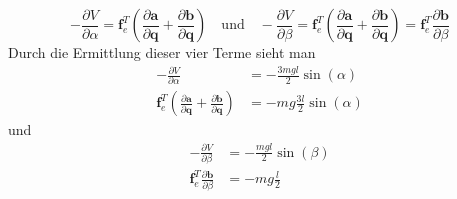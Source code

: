 \[
	-\frac{\partial V}{\partial \alpha} = \textbf{f}_e^T\left(\frac{\partial \textbf{a}}{\partial \textbf{q}} + \frac{\partial \textbf{b}}{\partial \textbf{q}}\right) \quad \text{und} \quad -\frac{\partial V}{\partial \beta} = \textbf{f}_e^T\left(\frac{\partial \textbf{a}}{\partial \textbf{q}} + \frac{\partial \textbf{b}}{\partial \textbf{q}}\right) = \textbf{f}_e^T\frac{\partial \textbf{b}}{\partial \beta}
\]
Durch die Ermittlung dieser vier Terme sieht man
\begin{align*}
		-\frac{\partial V}{\partial \alpha} &= -\frac{3mgl}{2}\sin(\alpha) \\
		\textbf{f}_e^T\left(\frac{\partial \textbf{a}}{\partial \textbf{q}} + \frac{\partial \textbf{b}}{\partial \textbf{q}}\right) &= -mg\frac{3l}{2}\sin(\alpha)
\end{align*}
und
\begin{align*}
	-\frac{\partial V}{\partial \beta} &= -\frac{mgl}{2}\sin(\beta) \\
	\textbf{f}_e^T\frac{\partial \textbf{b}}{\partial \beta} &= -mg\frac{l}{2}
\end{align*}